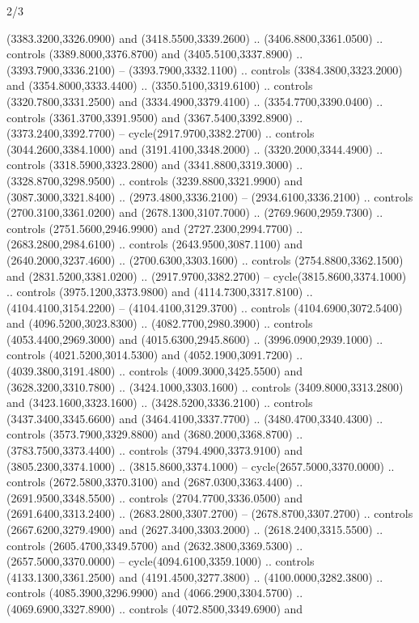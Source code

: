 \begin{flagdescription}{2/3}
\begin{scope}[shift={(0.5\flaglength,0.5)},scale=\flagwidth/130]
\begin{scope}[y=0.01mm, x=0.01mm,shift={(-3365,-2250)}]
  (3383.3200,3326.0900) and (3418.5500,3339.2600) .. (3406.8800,3361.0500) ..
  controls (3389.8000,3376.8700) and (3405.5100,3337.8900) ..
  (3393.7900,3336.2100) -- (3393.7900,3332.1100) .. controls
  (3384.3800,3323.2000) and (3354.8000,3333.4400) .. (3350.5100,3319.6100) ..
  controls (3320.7800,3331.2500) and (3334.4900,3379.4100) ..
  (3354.7700,3390.0400) .. controls (3361.3700,3391.9500) and
  (3367.5400,3392.8900) .. (3373.2400,3392.7700) -- cycle(2917.9700,3382.2700)
  .. controls (3044.2600,3384.1000) and (3191.4100,3348.2000) ..
  (3320.2000,3344.4900) .. controls (3318.5900,3323.2800) and
  (3341.8800,3319.3000) .. (3328.8700,3298.9500) .. controls
  (3239.8800,3321.9900) and (3087.3000,3321.8400) .. (2973.4800,3336.2100) --
  (2934.6100,3336.2100) .. controls (2700.3100,3361.0200) and
  (2678.1300,3107.7000) .. (2769.9600,2959.7300) .. controls
  (2751.5600,2946.9900) and (2727.2300,2994.7700) .. (2683.2800,2984.6100) ..
  controls (2643.9500,3087.1100) and (2640.2000,3237.4600) ..
  (2700.6300,3303.1600) .. controls (2754.8800,3362.1500) and
  (2831.5200,3381.0200) .. (2917.9700,3382.2700) -- cycle(3815.8600,3374.1000)
  .. controls (3975.1200,3373.9800) and (4114.7300,3317.8100) ..
  (4104.4100,3154.2200) -- (4104.4100,3129.3700) .. controls
  (4104.6900,3072.5400) and (4096.5200,3023.8300) .. (4082.7700,2980.3900) ..
  controls (4053.4400,2969.3000) and (4015.6300,2945.8600) ..
  (3996.0900,2939.1000) .. controls (4021.5200,3014.5300) and
  (4052.1900,3091.7200) .. (4039.3800,3191.4800) .. controls
  (4009.3000,3425.5500) and (3628.3200,3310.7800) .. (3424.1000,3303.1600) ..
  controls (3409.8000,3313.2800) and (3423.1600,3323.1600) ..
  (3428.5200,3336.2100) .. controls (3437.3400,3345.6600) and
  (3464.4100,3337.7700) .. (3480.4700,3340.4300) .. controls
  (3573.7900,3329.8800) and (3680.2000,3368.8700) .. (3783.7500,3373.4400) ..
  controls (3794.4900,3373.9100) and (3805.2300,3374.1000) ..
  (3815.8600,3374.1000) -- cycle(2657.5000,3370.0000) .. controls
  (2672.5800,3370.3100) and (2687.0300,3363.4400) .. (2691.9500,3348.5500) ..
  controls (2704.7700,3336.0500) and (2691.6400,3313.2400) ..
  (2683.2800,3307.2700) -- (2678.8700,3307.2700) .. controls
  (2667.6200,3279.4900) and (2627.3400,3303.2000) .. (2618.2400,3315.5500) ..
  controls (2605.4700,3349.5700) and (2632.3800,3369.5300) ..
  (2657.5000,3370.0000) -- cycle(4094.6100,3359.1000) .. controls
  (4133.1300,3361.2500) and (4191.4500,3277.3800) .. (4100.0000,3282.3800) ..
  controls (4085.3900,3296.9900) and (4066.2900,3304.5700) ..
  (4069.6900,3327.8900) .. controls (4072.8500,3349.6900) and

\end{scope}
\end{scope}
\end{flagdescription}

